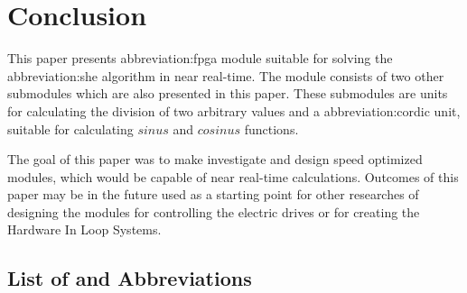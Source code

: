 \documentclass[a4paper, twoside, 11pt]{article}
\newcommand{\fbar}{\FloatBarrier}
\begin{document}
\newpage
{} 
\section*{Conclusion}
This paper presents \gls{abbreviation:fpga} module suitable for solving the \gls{abbreviation:she} algorithm in near real-time. The module consists of two other submodules which are also presented in this paper. These submodules are units for calculating the division of two arbitrary values and a \gls{abbreviation:cordic} unit, suitable for calculating $sinus$ and $cosinus$ functions.\par
The goal of this paper was to make investigate and design speed optimized modules, which would be capable of near real-time calculations. Outcomes of this paper may be in the future used as a starting point for other researches of designing the modules for controlling the electric drives or for creating the Hardware In Loop Systems.

\flushbottom %


\newpage
\setmonofont{Times New Roman}
\printbibliography[title={{References}}]	
\nocite{*}
\setmonofont{CourierPrime-Regular}
	\appendix
	\begin{appendices}
	\section{List of and Abbreviations}
		\printglossary[type=abbreviationslist, style = myStyleAbbreviations]
		\fbar
	\end{appendices}
\end{document}
